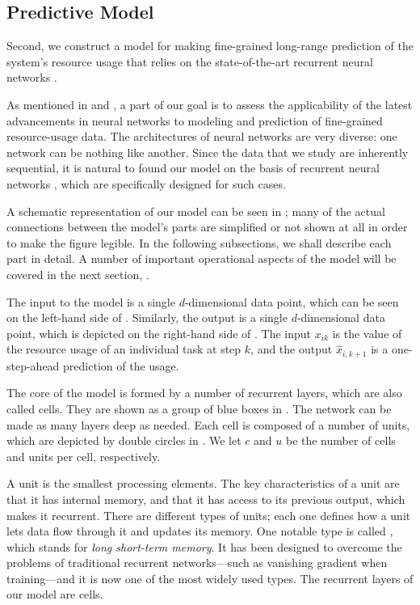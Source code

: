 \subsection{Predictive Model}

Second, we construct a model for making fine-grained long-range prediction of
the system's resource usage that relies on the state-of-the-art recurrent neural
networks \cite{goodfellow2016}.

As mentioned in  and , a part of our goal is to
assess the applicability of the latest advancements in neural networks
\cite{goodfellow2016} to modeling and prediction of fine-grained resource-usage
data. The architectures of neural networks are very diverse: one network can be
nothing like another. Since the data that we study are inherently sequential, it
is natural to found our model on the basis of recurrent neural networks
\cite{goodfellow2016}, which are specifically designed for such cases.

A schematic representation of our model can be seen in ; many of the
actual connections between the model's parts are simplified or not shown at all
in order to make the figure legible. In the following subsections, we shall
describe each part in detail. A number of important operational aspects of the
model will be covered in the next section, .

The input to the model is a single $d$-dimensional data point, which can be seen
on the left-hand side of . Similarly, the output is a single
$d$-dimensional data point, which is depicted on the right-hand side of
. The input $x_{ik}$ is the value of the resource usage of an
individual task at step $k$, and the output $\hat{x}_{i,k + 1}$ is a
one-step-ahead prediction of the usage.

The core of the model is formed by a number of recurrent layers, which are also
called cells. They are shown as a group of blue boxes in . The
network can be made as many layers deep as needed. Each cell is composed of a
number of units, which are depicted by double circles in . We let
$c$ and $u$ be the number of cells and units per cell, respectively.

A unit is the smallest processing elements. The key characteristics of a unit
are that it has internal memory, and that it has access to its previous output,
which makes it recurrent. There are different types of units; each one defines
how a unit lets data flow through it and updates its memory. One notable type is
called  \cite{hochreiter1997}, which stands for \emph{long short-term
memory}. It has been designed to overcome the problems of traditional recurrent
networks---such as vanishing gradient when training---and it is now one of the
most widely used types. The recurrent layers of our model are  cells.

